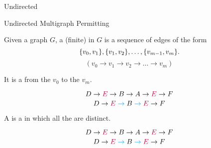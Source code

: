 \begin{frame}{}

  \begin{center}
    {Undirected }
  \end{center}
\end{frame}

\begin{frame}{}

  \vspace{-0.50cm}
  \begin{center}
    {Undirected Multigraph Permitting }
  \end{center}
\end{frame}

\begin{frame}{}
  \begin{definition}[Walk (道路)]
    Given a graph $G$, a (finite)  in $G$ is a sequence of edges of the form
    \[
      \{v_{0}, v_{1}\}, \{v_{1}, v_{2}\}, \dots, \{v_{m-1}, v_{m}\}.
    \]
    \[
      (v_{0} \to v_{1} \to v_{2} \to \dots \to v_{m})
    \]
    \pause
    \vspace{-0.80cm}
    \begin{center}
      It is a  from the  $v_{0}$ to the  $v_{m}$.
    \end{center}
  \end{definition}

  \pause
  \[
    D \to \textcolor{purple}{E} \to B \to A \to \textcolor{purple}{E} \to F
  \]
  \pause
  \[
    D \to \textcolor{purple}{E} \;\textcolor{cyan}{\to}\; B \;\textcolor{cyan}{\to}\; \textcolor{purple}{E} \to F
  \]
\end{frame}

\begin{frame}{}
  \begin{definition}[Trail (迹)]
    A  is a  in which all the  are distinct.
  \end{definition}

  \pause
  \[
    D \to \textcolor{purple}{E} \to B \to A \to \textcolor{purple}{E} \to F
  \]
  \[
    D \to \textcolor{purple}{E} \;\textcolor{cyan}{\to}\; B \;\textcolor{cyan}{\to}\; \textcolor{purple}{E} \to F
  \]
\end{frame}

